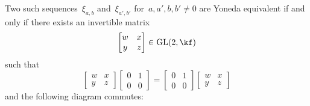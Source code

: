 \documentclass[a4paper,11pt]{scrartcl}
\begin{document}
Two such sequences~$\xi_{a,b}$ and~$\xi_{a',b'}$ for~$a, a', b, b' \neq 0$ are Yoneda equivalent if and only if there exists an invertible matrix
\[
  \begin{bmatrix}
    w & x \\
    y & z
  \end{bmatrix}
  \in
  \GL(2, \kf)
\]
such that
\begin{equation}
  \label{matrix is a homomorphism}
  \begin{bmatrix}
    w & x \\
    y & z
  \end{bmatrix}
  \begin{bmatrix}
    0 & 1 \\
    0 & 0
  \end{bmatrix}
  =
  \begin{bmatrix}
    0 & 1 \\
    0 & 0
  \end{bmatrix}
  \begin{bmatrix}
    w & x \\
    y & z
  \end{bmatrix}
\end{equation}
and the following diagram commutes:
\end{document}
